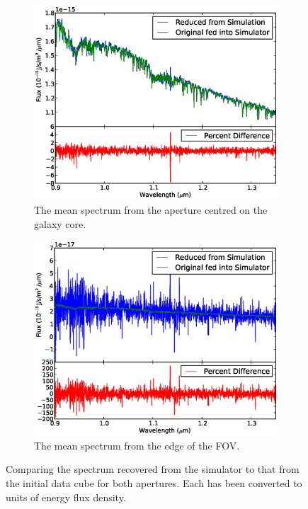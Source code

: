 \documentclass[11pt,twoside]{article}
\begin{document}
\begin{figure}[htp]
\centering  
\begin{subfigure}{0.5\textwidth}
\includegraphics[width=\textwidth]{reduced_spect}
\caption{ The mean spectrum from the aperture centred on the galaxy core.}
\end{subfigure}%
\begin{subfigure}{0.5\textwidth}
\includegraphics[width=\textwidth]{reduced_spect_edge}
\caption{The mean spectrum from the edge of the FOV.}
\end{subfigure}
\caption{Comparing the spectrum recovered from the simulator to that from the initial data cube for both apertures. Each has been converted to units of energy flux density.}
\label{rspec}
\end{figure}
\end{document}
